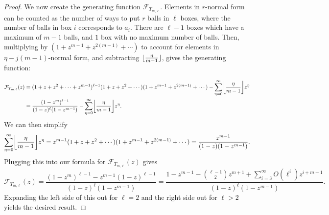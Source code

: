 \documentclass[10pt,a4paper]{article}
\theoremstyle{definition}
\theoremstyle{remark}
\numberwithin{equation}{section}
\numberwithin{theorem}{section}
\newcommand{\calf}{\mathcal{F}}
\DeclarePairedDelimiter{\floor}{\lfloor}{\rfloor}
\begin{document}
\begin{proof}
    We now create the generating function $\calf_{T_{m,\ell}}$. Elements in $r$-normal form can be counted as the number of ways to put $r$ balls in $\ell$ boxes, where the number of balls in box $i$ corresponds to $a_i$. There are $\ell-1$ boxes which have a maximum of $m-1$ balls, and $1$ box with no maximum number of balls. Then, multiplying by $(1+z^{m-1}+z^{2(m-1)}+\cdots)$ to account for elements in $\eta -j(m-1)$-normal form, and subtracting $\floor{\frac{\eta }{m-1}}$, gives the generating function:

    
   \begin{align*}
        \calf_{T_{m,\ell}}(z) &= (1+z+z^2+\cdots+z^{m-1})^{\ell-1}(1+z+z^2+\cdots)(1+z^{m-1}+z^{2(m-1)}+\cdots) - \sum_{\eta =0}^\infty \floor*{\frac{\eta }{m-1}} z^\eta \\&= \frac{(1-z^m)^{\ell-1}}{(1-z)^\ell(1-z^{m-1})}- \sum_{\eta =0}^\infty \floor*{\frac{\eta }{m-1}} z^\eta .
    \end{align*}
    We can then simplify \[\sum_{\eta =0}^\infty \floor*{\frac{\eta }{m-1}} z^\eta  = z^{m-1}(1+z+z^2+\cdots)(1+z^{m-1}+z^{2(m-1)} + \cdots) = \frac{z^{m-1}}{(1-z)(1-z^{m-1})}.\] Plugging this into our formula for $\calf_{T_{m,\ell}}(z)$ gives \[\calf_{T_{m,\ell}}(z) = \frac{(1-z^m)^{\ell-1}-z^{m-1}(1-z)^{\ell-1}}{(1-z)^\ell(1-z^{m-1})} = \frac{1-z^{m-1} -\binom{\ell-1}{2}z^{m+1} +\sum_{i=3}^{\infty}O(\ell^i)z^{i+m-1}}{(1-z)^\ell(1-z^{m-1})}.\] Expanding the left side of this out for $\ell = 2$ and the right side out for $\ell > 2$ yields the desired result.
\end{proof}
\end{document}
